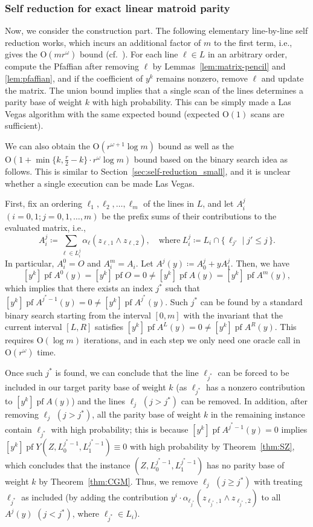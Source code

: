 \documentclass[11pt, a4paper]{article}
\theoremstyle{plain}
\theoremstyle{definition}
\theoremstyle{remark}
\DeclareMathOperator{\pf}{pf}
\begin{document}
\subsubsection{Self reduction for exact linear matroid parity}\label{sec:construction_LMP}
Now, we consider the construction part.
The following elementary line-by-line self reduction works, which incurs an additional factor of $m$ to the first term, i.e., gives the $\mathrm{O}(mr^\omega)$ bound (cf.~\cite[Section~7]{CLL2014}).
For each line $\ell \in L$ in an arbitrary order, compute the Pfaffian after removing $\ell$ by Lemmas~\ref{lem:matrix-pencil} and \ref{lem:pfaffian}, and if the coefficient of $y^k$ remains nonzero, remove $\ell$ and update the matrix.
The union bound implies that a single scan of the lines determines a parity base of weight $k$ with high probability.
This can be simply made a Las Vegas algorithm with the same expected bound (expected $\mathrm{O}(1)$ scans are sufficient).

We can also obtain the $\mathrm{O}(r^{\omega + 1} \log m)$ bound as well as the $\mathrm{O}(1 + \min\{k, \frac{r}{2} - k\} \cdot r^{\omega} \log m)$ bound based on the binary search idea as follows. This is similar to Section~\ref{sec:self-reduction_small}, and it is unclear whether a single execution can be made Las Vegas.

First, fix an ordering $\ell_1, \ell_2, \dots, \ell_m$ of the lines in $L$, and let $A_{i}^j$ $(i = 0, 1; j = 0, 1, \dots, m)$ be the prefix sums of their contributions to the evaluated matrix, i.e.,
\[A_i^j \coloneqq \sum_{\ell \in L_i^j} \alpha_{\ell}(z_{\ell, 1} \wedge z_{\ell, 2}), \quad \text{where}~L_i^j \coloneqq L_i \cap \{\, \ell_{j'} \mid j' \le j \,\}.\]
In particular, $A_i^0 = O$ and $A_i^{m} = A_i$.
Let $A^{j}(y) \coloneqq A_0^j + yA_{1}^{j}$.
Then, we have
\[[y^k]\pf A^{0}(y) = [y^k]\pf O = 0 \neq [y^k]\pf A(y) = [y^k]\pf A^{m}(y),\]
which implies that there exists an index $j^*$ such that $[y^k]\pf A^{j^*-1}(y) = 0 \neq [y^k]\pf A^{j^*}(y)$.
Such $j^*$ can be found by a standard binary search starting from the interval $[0, m]$ with the invariant that the current interval $[L, R]$ satisfies $[y^k]\pf A^{L}(y) = 0 \neq [y^k]\pf A^{R}(y)$.
This requires $\mathrm{O}(\log m)$ iterations, and in each step we only need one oracle call in $\mathrm{O}(r^\omega)$ time.

Once such $j^*$ is found, we can conclude that the line $\ell_{j^*}$ can be forced to be included in our target parity base of weight $k$ (as $\ell_{j^*}$ has a nonzero contribution to $[y^k]\pf A(y)$) and the lines $\ell_j$ $(j > j^*)$ can be removed.
In addition, after removing $\ell_j$ $(j > j^*)$, all the parity base of weight $k$ in the remaining instance contain $\ell_{j^*}$ with high probability; this is because $[y^k]\pf A^{j^*-1}(y) = 0$ implies $[y^k]\pf Y(Z, L_0^{j^*-1}, L_1^{j^*-1}) \equiv 0$ with high probability by Theorem~\ref{thm:SZ}, which concludes that the instance $(Z, L_0^{j^*-1}, L_1^{j^*-1})$ has no parity base of weight $k$ by Theorem~\ref{thm:CGM}.
Thus, we remove $\ell_j$ $(j \ge j^*)$ with treating $\ell_{j^*}$ as included (by adding the contribution $y^i \cdot \alpha_{\ell_{j^*}}(z_{\ell_{j^*},1} \wedge z_{\ell_{j^*},2})$ to all $A^j(y)$ $(j < j^*)$, where $\ell_{j^*} \in L_i$).
\end{document}
